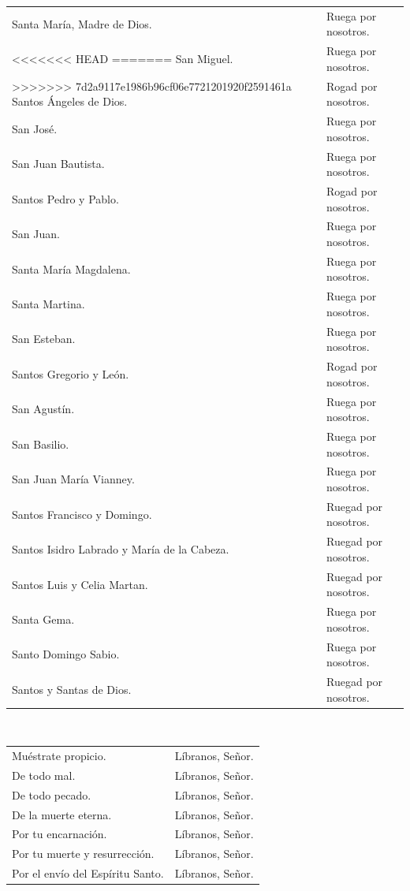 \documentclass[12pt, letterpaper]{report}
\begin{document}
\begin{tabular}{ll}
Santa Mar\'ia, Madre de Dios.& Ruega por nosotros. \\
<<<<<<< HEAD
=======
San Miguel.& Ruega por nosotros. \\
>>>>>>> 7d2a9117e1986b96cf06e7721201920f2591461a
Santos \'Angeles de Dios.& Rogad por nosotros. \\
San Jos\'e.& Ruega por nosotros. \\
San Juan Bautista.& Ruega por nosotros. \\
Santos Pedro y Pablo.& Rogad por nosotros. \\
San Juan.& Ruega por nosotros. \\
Santa Mar\'ia Magdalena.& Ruega por nosotros. \\
Santa Martina.& Ruega por nosotros. \\
San Esteban.& Ruega por nosotros. \\
Santos Gregorio y Le\'on.& Rogad por nosotros. \\
San Agust\'in.& Ruega por nosotros. \\
San Basilio.& Ruega por nosotros. \\
San Juan Mar\'ia Vianney.& Ruega por nosotros. \\
Santos Francisco y Domingo.& Ruegad por nosotros. \\
Santos Isidro Labrado y Mar\'ia de la Cabeza.& Ruegad por nosotros. \\
Santos Luis y Celia Martan.& Ruegad por nosotros. \\
Santa Gema.& Ruega por nosotros. \\
Santo Domingo Sabio.& Ruega por nosotros. \\
Santos y Santas de Dios.& Ruegad por nosotros.
\end{tabular} \newline \\

\begin{tabular}{ll}
Mu\'estrate propicio.& L\'ibranos, Se\~nor. \\
De todo mal.& L\'ibranos, Se\~nor. \\
De todo pecado.& L\'ibranos, Se\~nor. \\
De la muerte eterna.& L\'ibranos, Se\~nor. \\
Por tu encarnaci\'on.& L\'ibranos, Se\~nor. \\
Por tu muerte y resurrecci\'on.& L\'ibranos, Se\~nor. \\
Por el env\'io del Esp\'iritu Santo.& L\'ibranos, Se\~nor.
\end{tabular} \newline \\
\end{document}
